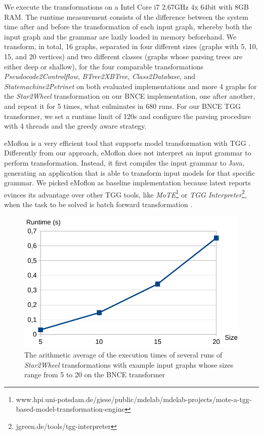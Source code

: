 We execute the transformations on a Intel Core i7 2.67GHz 4x 64bit with 8GB RAM. The runtime measurement consists of the difference between the system time after and before the transformation of each input graph, whereby both the input graph and the grammar are lazily loaded in memory beforehand. We transform, in total, 16 graphs, separated in four different sizes (graphs with 5, 10, 15, and 20 vertices) and two different classes (graphs whose parsing trees are either deep or shallow), for the four comparable transformations \emph{Pseudocode2Controlflow}, \emph{BTree2XBTree}, \emph{Class2Database}, and \emph{Statemachine2Petrinet} on both evaluated implementations and more 4 graphs for the \emph{Star2Wheel} transformation on our BNCE implementation, one after another, and repeat it for 5 times, what culminates in 680 runs. For our BNCE TGG transformer, we set a runtime limit of 120s and configure the parsing procedure with 4 threads and the greedy aware strategy.

eMoflon is a very efficient tool that supports model transformation with TGG \cite{leblebici2014developing}. Differently from our approach, eMoflon does not interpret an input grammar to perform transformation. Instead, it first compiles the input grammar to Java, generating an application that is able to transform input models for that specific grammar. We picked eMoflon as baseline implementation because latest reports evinces its advantage over other TGG tools, like \emph{MoTE}\footnote{www.hpi.uni-potsdam.de/giese/public/mdelab/mdelab-projects/mote-a-tgg-based-model-transformation-engine} or \emph{TGG Interpreter}\footnote{jgreen.de/tools/tgg-interpreter}, when the task to be solved is batch forward transformation \cite{hildebrandt2013survey, leblebici2014comparison}.

\begin{figure}
	\centering
	\includegraphics[width=.45\textwidth]{figures/performance/star2wheel}
	\caption{The arithmetic average of the execution times of several runs of \emph{Star2Wheel} transformations with example input graphs whose sizes range from 5 to 20 on the BNCE transformer}
	\label{fig:performance-star2wheel}
\end{figure}

